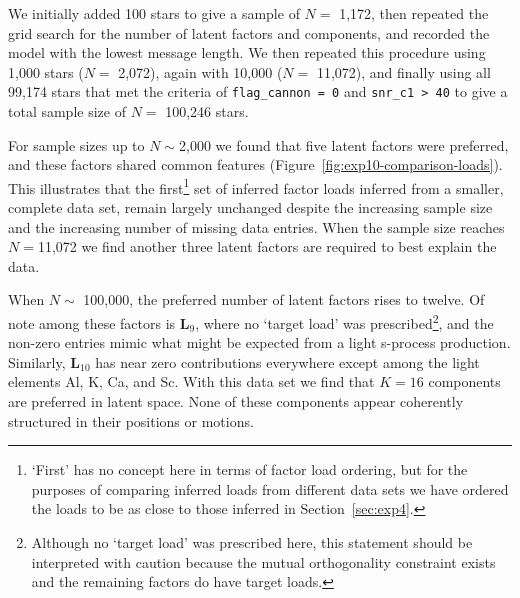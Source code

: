 \documentclass[twocolumn]{aastex62}
\newcommand{\factorloads}{\textbf{L}}
\begin{document}
We initially added 100 stars to give a sample of $N =$ 1,172, then repeated
the grid search for the number of latent factors and components, and recorded
the model with the lowest message length. We then repeated this
procedure using 1,000 stars ($N =$ 2,072), again with 10,000 ($N =$ 11,072),
and finally using all 99,174 stars that met the criteria of \texttt{flag\_cannon = 0} and
\texttt{snr\_c1 > 40} to give a total sample size of $N =$ 100,246 stars.

For sample sizes up to $N \sim $2,000 we found that five latent factors were
preferred, and these factors shared common features (Figure~\ref{fig:exp10-comparison-loads}). This illustrates that the
first\footnote{`First' has no concept here in terms of factor load ordering, but
for the purposes of comparing inferred loads from different data sets we have ordered
the loads to be as close to those inferred in Section~\ref{sec:exp4}.} set of inferred factor
loads inferred from a smaller, complete data set, remain largely unchanged despite the increasing sample size and the increasing number of missing data entries.
When the sample size reaches $N = $11,072 we find another three latent factors are
required to best explain the data.


When $N \sim$ 100,000, the preferred number of latent factors rises to twelve. Of note among these factors is $\factorloads_9$, where
no `target load' was prescribed\footnote{Although no `target load' was prescribed here, this statement should be interpreted with caution because the mutual orthogonality constraint exists and the remaining factors do have target loads.}, and the non-zero entries mimic what might be expected from a 
light s-process production. Similarly, $\factorloads_{10}$ has near zero contributions
everywhere except among the light elements Al, K, Ca, and Sc. 
With this data set we find that $K = 16$ components are preferred in latent space. None of these components appear coherently structured in their positions or motions.
\end{document}
